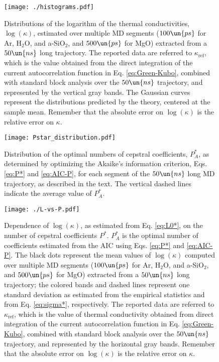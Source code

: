 \begin{figure}[!htb]
\centering
\texttt{[image: ./histograms.pdf]}
\caption{Distributions of the logarithm of the thermal conductivities, $\log(\kappa)$, estimated over multiple MD segments ($100\un{ps}$ for Ar, H$_2$O, and a-SiO$_2$, and $500\un{ps}$ for MgO) extracted from a $50\un{ns}$ long trajectory. The reported data are referred to $\kappa_\mathrm{ref}$, which is the value obtained from the direct integration of the current autocorrelation function in Eq. \eqref{eq:Green-Kubo}, combined with standard block analysis over the $50\un{ns}$ trajectory, and represented by the vertical gray bands. The Gaussian curves represent the distributions predicted by the theory, centered at the sample mean. Remember that the absolute error on $\log(\kappa)$ is the relative error on $\kappa$.}
\label{fig:histograms}

\texttt{[image: Pstar\_distribution.pdf]}
\caption{Distribution of the optimal numbers of cepstral coefficients, $P_A^*$, as determined by optimizing the Akaike's information criterion, Eqs. \eqref{eq:P*} and \eqref{eq:AIC-P}, for each segment of the $50\un{ns}$ long MD trajectory, as described in the text. The vertical dashed lines indicate the average value of $P_A^*$.}
\label{fig:Pstar_distribution}
\end{figure}

\begin{figure}[!ht]
\centering
\texttt{[image: ./L-vs-P.pdf]}
\caption{Dependence of $\log(\kappa)$, as estimated from Eq. \eqref{eq:L0*}, on the number of cepstral coefficients $P^*$. $P_A^*$ is the optimal number of coefficients estimated from the AIC using Eqs. \eqref{eq:P*} and \eqref{eq:AIC-P}. The black dots represent the mean values of $\log(\kappa)$ computed over multiple MD segments ($100\un{ps}$ for Ar, H$_2$O, and a-SiO$_2$, and $500\un{ps}$ for MgO) extracted from a $50\un{ns}$ long trajectory; the colored bands and dashed lines represent one standard deviation as estimated from the empirical statistics and from Eq. \eqref{eq:sigma*}, respectively. The reported data are referred to $\kappa_{\mathrm{ref}}$, which is the value of thermal conductivity obtained from direct integration of the current autocorrelation function in Eq. \eqref{eq:Green-Kubo}, combined with standard block analysis over the $50\un{ns}$ trajectory, and represented by the horizontal gray bands. Remember that the absolute error on $\log(\kappa)$ is the relative error on $\kappa$.}
\label{fig:L-vs-P}
\end{figure}

